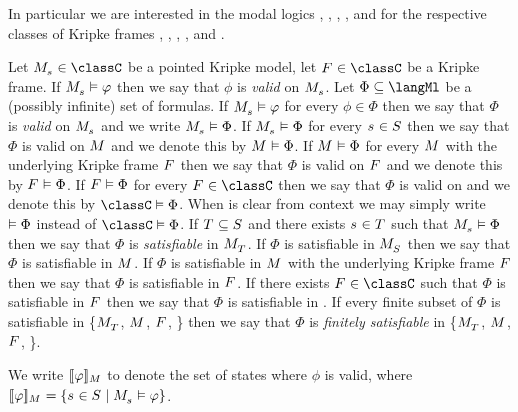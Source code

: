 In particular we are interested in the modal logics \logicK{}, \logicKF{}, \logicKFF{}, \logicKD{}, and \logicS{} for the respective classes of Kripke frames \classK{}, \classKF{}, \classKFF{}, \classKD{}, and \classS{}.

Let $\kPModel{\kStateS} \in \classC$ be a pointed Kripke model,
let $\kFrame \in \classC$ be a Kripke frame.
If $\kPModel{\kStateS} \entails \phi$ then we say that $\phi$ is {\em valid} on $\kPModel{\kStateS}$.
Let $\Phi \subseteq \langMl$ be a (possibly infinite) set of formulas.
If $\kPModel{\kStateS} \entails \phi$ for every $\phi \in \Phi$ then we say that $\Phi$ is {\em valid} on $\kPModel{\kStateS}$ and we write $\kPModel{\kStateS} \entails \Phi$.
If $\kPModel{\kStateS} \entails \Phi$ for every $\kStateS \in \kStates$ then we say that $\Phi$ is valid on $\kModel$ and we denote this by $\kModel \entails \Phi$.
If $\kModel \entails \Phi$ for every $\kModel$ with the underlying Kripke frame $\kFrame$ then we say that $\Phi$ is valid on $\kFrame$ and we denote this by $\kFrame \entails \Phi$.
If $\kFrame \entails \Phi$ for every $\kFrame \in \classC$ then we say that $\Phi$ is valid on \classC{} and we denote this by $\classC \entails \Phi$.
When \classC{} is clear from context we may simply write $\vDash \Phi$ instead of $\classC \entails \Phi$.
If $\kStatesT \subseteq \kStates$ and there exists $\kStateS \in \kStatesT$ such that $\kPModel{\kStateS} \entails \Phi$ then we say that $\Phi$ is {\em satisfiable} in $\kPModel{\kStatesT}$.
If $\Phi$ is satisfiable in $\kPModel{\kStates}$ then we say that $\Phi$ is satisfiable in $\kModel$.
If $\Phi$ is satisfiable in $\kModel$ with the underlying Kripke frame $\kFrame$ then we say that $\Phi$ is satisfiable in $\kFrame$.
If there exists $\kFrame \in \classC$ such that $\Phi$ is satisfiable in $\kFrame$ then we say that $\Phi$ is satisfiable in \classC{}.
If every finite subset of $\Phi$ is satisfiable in \{$\kPModel{\kStatesT}$, $\kModel$, $\kFrame$, \classC{}\} then we say that $\Phi$ is {\em finitely satisfiable} in \{$\kPModel{\kStatesT}$, $\kModel$, $\kFrame$, \classC{}\}.

We write $\interpretation[\kModel]{\phi}$ to denote the set of states where $\phi$ is valid, where $\interpretation[\kModel]{\phi} = \{\kStateS \in \kStates \mid \kPModel{\kStateS} \entails \phi\}$.

